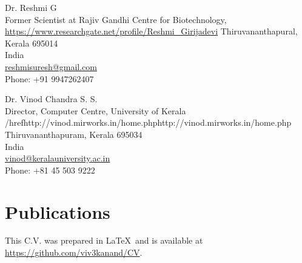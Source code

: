 \documentclass[a4paper, 10pt]{article}
\begin{document}
\begin{minipage}[ht]{.50\textwidth}
Dr. Reshmi G \\
Former Scientist at Rajiv Gandhi Centre for Biotechnology, \\
\href{https://www.researchgate.net/profile/Reshmi_Girijadevi}{https://www.researchgate.net/profile/Reshmi_Girijadevi}
Thiruvananthapural, Kerala 695014 \\
India \\
\href{mailto:reshmisuresh@gmail.com}{reshmisuresh@gmail.com} \\
Phone: +91 9947262407
\end{minipage}
\begin{minipage}[ht]{.50\textwidth}
Dr. Vinod Chandra S. S. \\
Director, Computer Centre, University of Kerala \\
/href{http://vinod.mirworks.in/home.php}{http://vinod.mirworks.in/home.php} \\
Thiruvananthapuram, Kerala 695034\\
India \\
\href{mailto:vinod@keralauniversity.ac.in}{vinod@keralauniversity.ac.in} \\
Phone: +81 45 503 9222
\end{minipage}

\section*{Publications}
\begingroup
   \renewcommand{\section}[2]{}
   
   \nocite{*}
   
\endgroup

\vfill

\footnotesize
This C.V. was prepared in \LaTeX\ and is available at \href{https://github.com/viv3kanand/CV}{https://github.com/viv3kanand/CV}.
\end{document}
